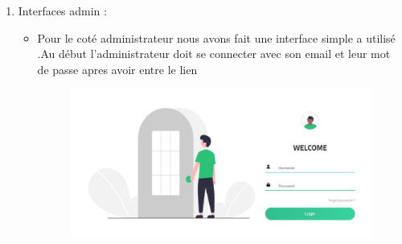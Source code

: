 \documentclass[a4paper,12pt,oneside]{article}
\begin{document}
{\begin{enumerate}
\begin{itemize}
		
  	\end{itemize}
  \newpage
  	\item Interfaces admin :
  	
  	\begin{itemize}
  	\item Pour le coté administrateur nous avons fait une interface simple a utilisé .Au début l’administrateur
doit se connecter avec son email et leur mot de passe apres avoir entre le lien
		\begin{figure}[h]
  		\centering
  		\includegraphics[width=1\textwidth]{adminlogin}
		\end{figure}
		

\end{itemize}
\end{enumerate}}
\end{document}
